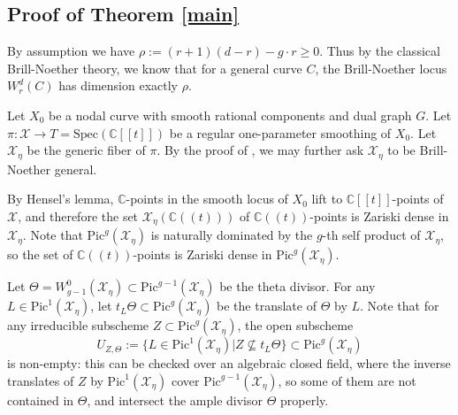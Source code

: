 \documentclass[11pt]{amsart}
\newcommand{\com}[1]{{\color{brown}$\textsuperscript{+}$\marginnote{\small #1}}}
\newcommand{\cX}{\mathcal X}
\begin{document}


\subsection{Proof of Theorem \ref{main}}
By assumption we have  $\rho:=(r+1)(d-r)-g\cdot r\geq0.$  Thus by the classical Brill-Noether theory, we know that for a general curve $C$, the Brill-Noether locus $W_r^d(C)$ has dimension exactly $\rho$.

Let $X_0$ be a nodal curve with smooth rational components and dual graph $G$. 
Let $\pi\colon\mathcal{X}\to T=\mathrm{Spec}(\mathbb{C}[[t]])$ be a regular one-parameter smoothing of $X_0$. Let $\cX_\eta$ be the generic fiber of $\pi$. By the proof of \cite[Theorem B.2]{MR2448666}, we may further ask $\cX_\eta$ to be Brill-Noether general. 

By Hensel's lemma, $\mathbb{C}$-points in the smooth locus of $X_0$ lift to $\mathbb{C}[[t]]$-points of $\mathcal{X}$, and therefore the set $\cX_\eta(\mathbb{C}((t)))$ of $\mathbb{C}((t))$-points is Zariski dense in $\mathcal{X}_\eta$. Note that $\mathrm{Pic}^g(\cX_\eta)$ is naturally dominated by the $g$-th self product of $\cX_\eta$, so the set of $\mathbb{C}((t))$-points is Zariski dense in $\mathrm{Pic}^g(\cX_\eta)$.

Let $\Theta=W_{g-1}^0(\cX_\eta)\subset\mathrm{Pic}^{g-1}(\cX_\eta)$ be the theta divisor. For any $L\in\mathrm{Pic}^1(\cX_\eta)$, let $t_L\Theta\subset\mathrm{Pic}^g(\cX_\eta)$ be the translate of $\Theta$ by $L$. Note that for any irreducible subscheme $Z\subset\mathrm{Pic}^g(\cX_\eta)$, the open subscheme $$U_{Z,\Theta}:=\{L\in\mathrm{Pic}^1(\cX_\eta)|Z\nsubseteq t_L\Theta\}\subset\mathrm{Pic}^g(\cX_\eta)$$ is non-empty: this can be checked over an algebraic closed field, where the inverse translates of $Z$ by $\mathrm{Pic}^1(\cX_\eta)$ cover $\mathrm{Pic}^{g-1}(\cX_\eta)$, so some of them are not contained in $\Theta$, and intersect the ample divisor $\Theta$ properly. 
\end{document}
